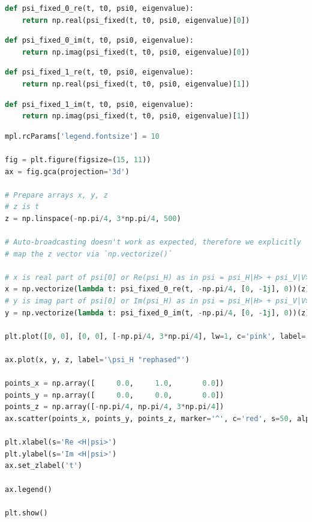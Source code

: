 \begin{lstlisting}[language=Python]
def psi_fixed_0_re(t, t0, psi0, eigenvalue):
    return np.real(psi_fixed(t, t0, psi0, eigenvalue)[0])
\end{lstlisting}

\begin{lstlisting}[language=Python]
def psi_fixed_0_im(t, t0, psi0, eigenvalue):
    return np.imag(psi_fixed(t, t0, psi0, eigenvalue)[0])
\end{lstlisting}

\begin{lstlisting}[language=Python]
def psi_fixed_1_re(t, t0, psi0, eigenvalue):
    return np.real(psi_fixed(t, t0, psi0, eigenvalue)[1])
\end{lstlisting}

\begin{lstlisting}[language=Python]
def psi_fixed_1_im(t, t0, psi0, eigenvalue):
    return np.imag(psi_fixed(t, t0, psi0, eigenvalue)[1])
\end{lstlisting}

\begin{lstlisting}[language=Python]
mpl.rcParams['legend.fontsize'] = 10

fig = plt.figure(figsize=(15, 11))
ax = fig.gca(projection='3d')

# Prepare arrays x, y, z
# z is t
z = np.linspace(-np.pi/4, 3*np.pi/4, 500)

# Auto-broadcasting doesn't work as expected, therefore we explicitly
# map the z vector via `np.vectorize()`

# x is real part of psi[0] or Re(psi_H) as in psi = psi_H|H> + psi_V|V>
x = np.vectorize(lambda t: psi_fixed_0_re(t, -np.pi/4, [0, -1j], 0))(z) 
# y is imag part of psi[0] or Im(psi_H) as in psi = psi_H|H> + psi_V|V>
y = np.vectorize(lambda t: psi_fixed_0_im(t, -np.pi/4, [0, -1j], 0))(z) 

plt.plot([0, 0], [0, 0], [-np.pi/4, 3*np.pi/4], lw=1, c='pink', label='Time (clock cycle)')

ax.plot(x, y, z, label='\psi_H "rephased"')

points_x = np.array([     0.0,     1.0,       0.0])
points_y = np.array([     0.0,     0.0,       0.0])
points_z = np.array([-np.pi/4, np.pi/4, 3*np.pi/4])
ax.scatter(points_x, points_y, points_z, marker='^', c='red', s=50, alpha=1.0, label='discrete PW')

plt.xlabel(s='Re <H|psi>')
plt.ylabel(s='Im <H|psi>')
ax.set_zlabel('t')

ax.legend()

plt.show()
\end{lstlisting}

